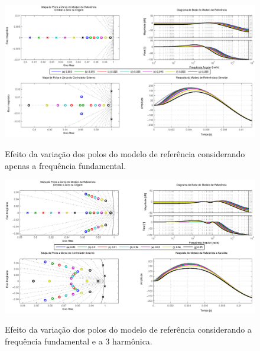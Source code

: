 \documentclass[repeatfields,oneside,overleaf]{tcc}
\begin{document}
\begin{figure}[!ht]
    \centering
    \caption{Efeito da variação dos polos do modelo de referência considerando apenas a frequência fundamental.}
    \includegraphics[trim={80 20 80 10}, clip, width=\linewidth]{fig/f_1.eps}
    \\
\end{figure}

\begin{figure}[!ht]
    \centering
    \caption{Efeito da variação dos polos do modelo de referência considerando a frequência fundamental e a 3{\textordfeminine} harmônica.}
    \includegraphics[trim={80 20 80 10}, clip, width=\linewidth]{fig/f_3.eps}
    \\
\end{figure}
\end{document}
